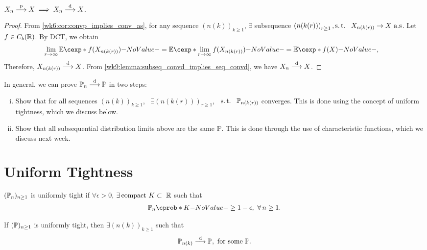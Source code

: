 \documentclass[12pt]{article}
\begin{document}
\begin{Lemma}\label{wk9:lem:convpd}
$X_n \stackrel{\mathrm{p}}{\longrightarrow} X \implies X_n \stackrel{\mathrm{d}}{\longrightarrow} X$.
\end{Lemma}
\begin{proof}
From \cref{wk6:cor:convp_implies_conv_as}, for any sequence $\left(n(k)\right)_{k \geq 1}$, $\exists$ subsequence $\left(n(k(r))\right)_{r \geq 1}, \st\ X_{n(k(r))} \to X \ \text{a.s}$. Let $f \in C_b(\mathbb{R})$. By DCT, we obtain
\begin{align*}
&\lim_{r \to \infty} \E[f(X_{n(k(r))})] 
= \E[\lim_{r \to \infty} f(X_{n(k(r))})] 
= \E[f(X)],
\end{align*}
Therefore, $X_{n(k(r))} \stackrel{\mathrm{d}}{\longrightarrow} X$. From \cref{wk9:lemma:subseq_convd_implies_seq_convd}, we have $X_n \stackrel{\mathrm{d}}{\longrightarrow} X$.
\end{proof}


In general, we can prove $\P_n \convd \P$ in two steps:
\begin{enumerate}[(i)]
\item Show that for all sequences $\left(n(k)\right)_{k \geq 1}$, \ $\exists \left(n(k(r))\right)_{r \geq 1}$, \ $\st\ \P_{n(k(r))}$ converges. This is done using the concept of uniform tightness, which we discuss below.
\item Show that all subsequential distribution limits above are the same $\P$. This is done through the use of characteristic functions, which we discuss next week.
\end{enumerate}

\section{Uniform Tightness}

\begin{Definition}
$(\P_n)_{n \geq 1}$ is uniformly tight if $\forall \epsilon > 0$, $\exists \text{compact}\ K \subset\ \bbR$ such that
\begin{align*}
\P_n(K) \geq 1 - \epsilon, \ \forall n \geq 1.
\end{align*}
\end{Definition}
%
\begin{Theorem}\label{wk9:thm:Helly}
If $(\P)_{n \geq 1}$ is uniformly tight, then $\exists \left(n(k)\right)_{k \geq 1}$ such that
\begin{align*}
\P_{n(k)} \convd \P, \ \text{for some}\ \P.
\end{align*}
\end{Theorem}
\end{document}
